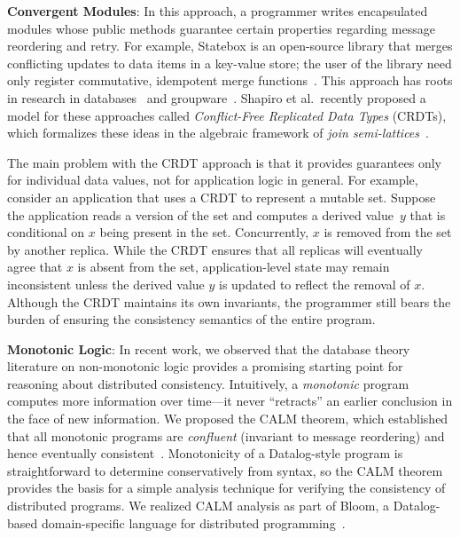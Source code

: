 \vspace{0.5em}\noindent
\textbf{Convergent Modules}: In this approach, a programmer writes encapsulated
modules whose public methods guarantee certain properties regarding message
reordering and retry. For example, Statebox is an open-source library that
merges conflicting updates to data items in a key-value store; the user of the
library need only register commutative, idempotent merge
functions~\cite{statebox}. This approach has roots in research in
databases~\cite{Farrag1989,Garcia-Molina1983,Helland2009} and
groupware~\cite{Ellis1989,Sun1998}.  Shapiro et al.\ recently proposed a model
for these approaches called \emph{Conflict-Free Replicated Data Types} (CRDTs),
which formalizes these ideas in the algebraic framework of {\em join
  semi-lattices}~\cite{Shapiro2011b}.

The main problem with the CRDT approach is that it provides guarantees only
for individual data values, not for application logic in general. For example,
consider an application that uses a CRDT to represent a mutable set. Suppose the
application reads a version of the set and computes a derived value~$y$ that is
conditional on $x$ being present in the set. Concurrently, $x$ is removed from
the set by another replica. While the CRDT ensures that all replicas will
eventually agree that $x$ is absent from the set, application-level state may
remain inconsistent unless the derived value $y$ is updated to reflect the
removal of $x$. Although the CRDT maintains its own invariants, the programmer
still bears the burden of ensuring the consistency semantics of the entire
program.


\vspace{0.5em} \noindent
\textbf{Monotonic Logic}: In recent work, we observed that the database theory
literature on non-monotonic logic provides a promising starting point for
reasoning about distributed consistency. Intuitively, a \emph{monotonic} program
computes more information over time---it never ``retracts'' an earlier
conclusion in the face of new information. We proposed the CALM theorem, which
established that all monotonic programs are \emph{confluent} (invariant to
message reordering) and hence eventually
consistent~\cite{Ameloot2011,Hellerstein2010,dedalus-pods12-tr}. Monotonicity of
a Datalog-style program is straightforward to determine conservatively from
syntax, so the CALM theorem provides the basis for a simple analysis technique
for verifying the consistency of distributed programs. We realized CALM analysis
as part of Bloom, a Datalog-based domain-specific language for distributed
programming~\cite{Alvaro2011,bloom}.

